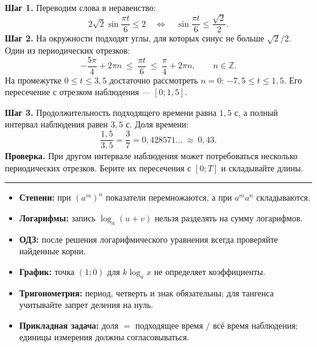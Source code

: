 \documentclass[a4paper,12pt]{article}
\newcommand{\sect}[2]{%
  \Needspace{7\baselineskip}%
  \vspace{6pt}\noindent{\large\textcolor{darkaccent}{#1.\enspace #2}}\par\vspace{-1pt}%
  {\color{accent}\rule{\linewidth}{0.45pt}}\par\vspace{5pt}}
\newcommand{\warn}[1]{\textcolor{darkaccent}{\textbf{Проверка.}} #1}
\begin{document}
\textbf{Шаг 1.} Переводим слова в неравенство:
\[
 2\sqrt2\sin\frac{\pi t}{6}\le2
 \quad\Longleftrightarrow\quad
 \sin\frac{\pi t}{6}\le\frac{\sqrt2}{2}.
\]
\textbf{Шаг 2.} На окружности подходят углы, для которых синус не больше $\sqrt2/2$. Один из периодических отрезков:
\[
 -\frac{5\pi}{4}+2\pi n\ \le\ \frac{\pi t}{6}\ \le\ \frac\pi4+2\pi n,
 \qquad n\in\mathbb Z.
\]
На промежутке $0\le t\le3{,}5$ достаточно рассмотреть $n=0$: $-7{,}5\le t\le1{,}5$. Его пересечение с отрезком наблюдения --- $[0;1{,}5]$.

\textbf{Шаг 3.} Продолжительность подходящего времени равна $1{,}5$ с, а полный интервал наблюдения равен $3{,}5$ с. Доля времени:
\[
 \frac{1{,}5}{3{,}5}=\frac37=0{,}428571\ldots\ \approx\ \boxed{0{,}43}.
\]
\warn{При другом интервале наблюдения может потребоваться несколько периодических отрезков. Берите их пересечения с $[0;T]$ и складывайте длины.}

\sect{10}{Памятка по типичным ошибкам}
\begin{itemize}
\item \textbf{Степени:} при $(a^m)^n$ показатели перемножаются, а при $a^m a^n$ складываются.
\item \textbf{Логарифмы:} запись $\log_a(u+v)$ нельзя разделять на сумму логарифмов.
\item \textbf{ОДЗ:} после решения логарифмического уравнения всегда проверяйте найденные корни.
\item \textbf{График:} точка $(1;0)$ для $k\log_a x$ не определяет коэффициенты.
\item \textbf{Тригонометрия:} период, четверть и знак обязательны; для тангенса учитывайте запрет деления на нуль.
\item \textbf{Прикладная задача:} доля $=$ подходящее время $/$ всё время наблюдения; единицы измерения должны согласовываться.
\end{itemize}
\end{document}
